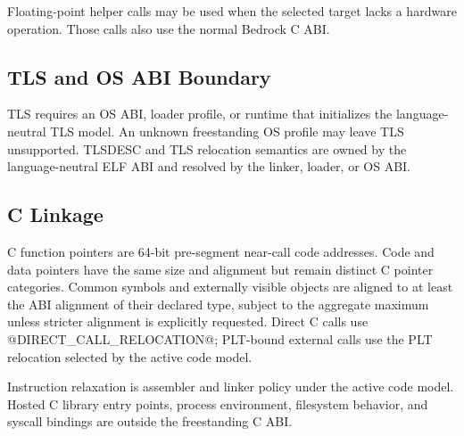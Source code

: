 Floating-point helper calls may be used when the selected target lacks a
hardware operation. Those calls also use the normal Bedrock C ABI.

\subsection{TLS and OS ABI Boundary}
TLS requires an OS ABI, loader profile, or runtime that initializes the
language-neutral TLS model. An unknown freestanding OS profile may leave TLS
unsupported. TLSDESC and TLS relocation semantics are owned by the
language-neutral ELF ABI and resolved by the linker, loader, or OS ABI.

\subsection{C Linkage}
C function pointers are 64-bit pre-segment near-call code addresses. Code and
data pointers have the same size and alignment but remain distinct C pointer
categories. Common symbols and externally visible objects are aligned to at
least the ABI alignment of their declared type, subject to the aggregate maximum
unless stricter alignment is explicitly requested. Direct C calls use
@DIRECT_CALL_RELOCATION@; PLT-bound external calls use the PLT relocation
selected by the active code model.

Instruction relaxation is assembler and linker policy under the active code
model. Hosted C library entry points, process environment, filesystem behavior,
and syscall bindings are outside the freestanding C ABI.
